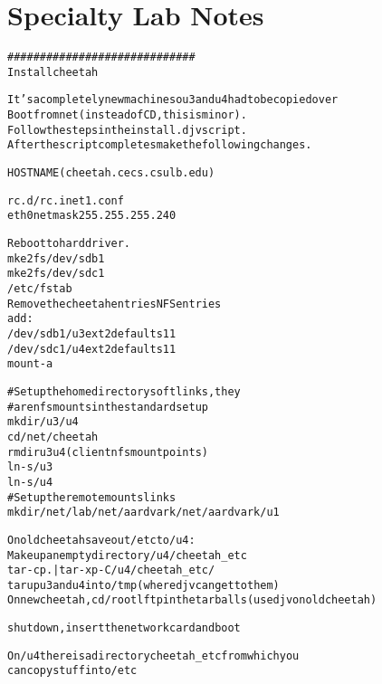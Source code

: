 \chapter{Specialty Lab Notes} \label{ap:special}

\begin{alltt}
\normalfont
\singlespacing

#############################
Install cheetah

It's a completely new machine so u3 and u4 had to be copied over
Boot from net (instead of CD, this is minor).
Follow the steps in the install.djv script.
After the script completes make the following changes.

HOSTNAME (cheetah.cecs.csulb.edu)

rc.d/rc.inet1.conf
  eth0 netmask 255.255.255.240

Reboot to hard driver.
mke2fs /dev/sdb1
mke2fs /dev/sdc1
/etc/fstab
 Remove the cheetah entries NFS entries
 add:
  /dev/sdb1 /u3 ext2 defaults 1 1
  /dev/sdc1 /u4 ext2 defaults 1 1
mount -a

#Setup the home directory soft links, they
# are nfs mounts in the standard setup
mkdir /u3 /u4
cd /net/cheetah
rmdir u3 u4  (client nfs mount points)
ln -s /u3
ln -s /u4
# Setup the remote mounts links
mkdir /net/lab /net/aardvark /net/aardvark/u1

On old cheetah save out /etc to /u4:
Make up an empty directory /u4/cheetah_etc
tar -cp . | tar -xp -C /u4/cheetah_etc/
tar up u3 and u4 into /tmp (where djv can get to them)
On new cheetah, cd /root lftp in the tarballs (use djv on old cheetah)

shutdown, insert the network card and boot

On /u4 there is a directory cheetah_etc from which you
can copy stuff into  /etc


\end{alltt}
